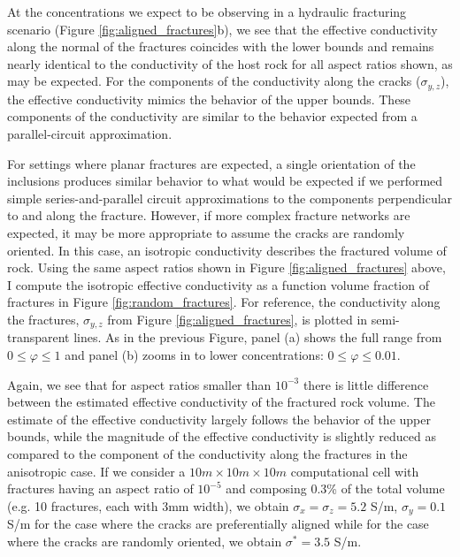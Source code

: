 At the concentrations we expect to be observing in a hydraulic fracturing scenario (Figure \ref{fig:aligned_fractures}b), we see that the effective conductivity along the normal of the fractures coincides with the lower bounds and remains nearly identical to the conductivity of the host rock for all aspect ratios shown, as may be expected. For the components of the conductivity along the cracks ($\sigma_{y, z}$), the effective conductivity mimics the behavior of the upper bounds. These components of the conductivity are similar to the behavior expected from a parallel-circuit approximation.

For settings where planar fractures are expected, a single orientation of the inclusions produces similar behavior to what would be expected if we performed simple series-and-parallel circuit approximations to the components perpendicular to and along the fracture. However, if more complex fracture networks are expected, it may be more appropriate to assume the cracks are randomly oriented. In this case, an isotropic conductivity describes the fractured volume of rock. Using the same aspect ratios shown in Figure \ref{fig:aligned_fractures} above, I compute the isotropic effective conductivity as a function volume fraction of fractures in Figure \ref{fig:random_fractures}. For reference, the conductivity along the fractures, $\sigma_{y, z}$ from Figure \ref{fig:aligned_fractures}, is plotted in semi-transparent lines. As in the previous Figure, panel (a) shows the full range from $0 \leq \varphi \leq 1$ and panel (b) zooms in to lower concentrations: $0 \leq \varphi \leq 0.01$.



Again, we see that for aspect ratios smaller than $10^{-3}$ there is little difference between the estimated effective conductivity of the fractured rock volume. The estimate of the effective conductivity largely follows the behavior of the upper bounds, while the magnitude of the effective conductivity is slightly reduced as compared to the component of the conductivity along the fractures in the anisotropic case. If we consider a $10m \times 10m \times 10m$ computational cell with fractures having an aspect ratio of $10^{-5}$ and composing 0.3\% of the total volume (e.g. 10 fractures, each with 3mm width), we obtain $\sigma_x = \sigma_z = 5.2$ S/m, $\sigma_y = 0.1$ S/m for the case where the cracks are preferentially aligned while for the case where the cracks are randomly oriented, we obtain $\sigma^* = 3.5$ S/m.

